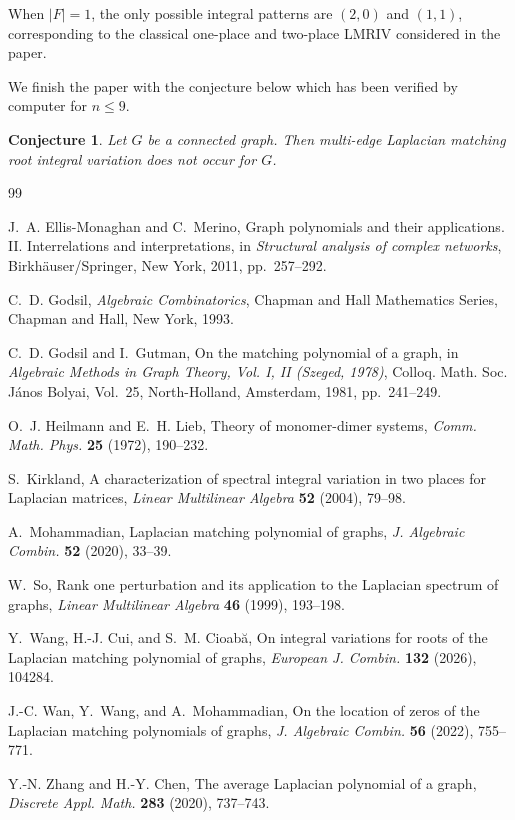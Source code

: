 \documentclass[11pt]{amsart}
\numberwithin{equation}{section}
\newtheorem{conjecture}[theorem]{Conjecture}
\begin{document}
When $|F|=1$, the only possible integral patterns are $(2,0)$ and $(1,1)$, corresponding 
to the classical one-place and two-place LMRIV considered in the paper.

We finish the paper with the conjecture below which has been verified by computer for $n \leq 9$.
\begin{conjecture}
Let $G$ be a connected graph. Then multi-edge Laplacian matching root integral variation does not occur for $G$.
\end{conjecture}


\begin{thebibliography}{99}

J.~A. Ellis-Monaghan and C.~Merino,
Graph polynomials and their applications. {II}. {I}nterrelations and interpretations,
in \emph{Structural analysis of complex networks}, Birkh\"auser/Springer, New York, 2011, pp.~257--292.

C.~D. Godsil,
\emph{Algebraic Combinatorics},
Chapman and Hall Mathematics Series, Chapman and Hall, New York, 1993.

C.~D. Godsil and I.~Gutman,
On the matching polynomial of a graph,
in \emph{Algebraic Methods in Graph Theory, Vol. I, II (Szeged, 1978)},
Colloq. Math. Soc. J\'anos Bolyai, Vol.~25, North-Holland, Amsterdam, 1981, pp.~241--249.

O.~J. Heilmann and E.~H. Lieb,
Theory of monomer-dimer systems,
\emph{Comm. Math. Phys.} \textbf{25} (1972), 190--232.

S.~Kirkland,
A characterization of spectral integral variation in two places for Laplacian matrices,
\emph{Linear Multilinear Algebra} \textbf{52} (2004), 79--98.

A.~Mohammadian,
Laplacian matching polynomial of graphs,
\emph{J. Algebraic Combin.} \textbf{52} (2020), 33--39.

W.~So,
Rank one perturbation and its application to the Laplacian spectrum of graphs,
\emph{Linear Multilinear Algebra} \textbf{46} (1999), 193--198.

Y.~Wang, H.-J. Cui, and S.~M. Cioab\u{a},
On integral variations for roots of the Laplacian matching polynomial of graphs,
\emph{European J. Combin.} \textbf{132} (2026), 104284.

J.-C. Wan, Y.~Wang, and A.~Mohammadian,
On the location of zeros of the Laplacian matching polynomials of graphs,
\emph{J. Algebraic Combin.} \textbf{56} (2022), 755--771.

Y.-N. Zhang and H.-Y. Chen,
The average Laplacian polynomial of a graph,
\emph{Discrete Appl. Math.} \textbf{283} (2020), 737--743.

\end{thebibliography}
\end{document}
